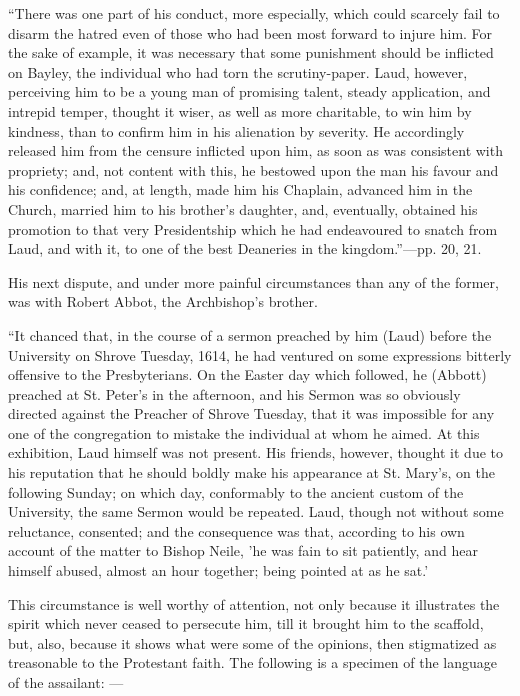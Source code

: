 ``There was one part of his conduct,
more especially, which could scarcely fail to disarm the hatred even of
those who had been most forward to injure him. For the sake of example,
it was necessary that some punishment should be inflicted on Bayley, the
individual who had torn the scrutiny-paper. Laud, however, perceiving
him to be a young man of promising talent,
steady application, and intrepid temper, thought it wiser, as well as
more charitable, to win him by kindness, than to confirm him in his
alienation by severity. He accordingly released him from the censure
inflicted upon him, as soon as was consistent with propriety; and, not
content with this, he bestowed upon the man his favour and his
confidence; and, at length, made him his Chaplain, advanced him in the
Church, married him to his brother's daughter, and, eventually, obtained
his promotion to that very Presidentship which he had endeavoured to
snatch from Laud, and with it, to one of the best Deaneries in the
kingdom.''—pp. 20, 21.

His next dispute, and under more painful
circumstances than any of the former, was with Robert Abbot, the
Archbishop's brother.

``It chanced that, in the course of a
sermon preached by him (Laud) before the University on Shrove Tuesday,
1614, he had ventured on some expressions bitterly offensive to the
Presbyterians. On the Easter day which followed, he (Abbott) preached at
St. Peter's in the afternoon, and his Sermon was so obviously directed
against the Preacher of Shrove Tuesday, that it was impossible for any
one of the congregation to mistake the individual at whom he aimed. At
this exhibition, Laud himself was not present. His friends, however,
thought it due to his reputation that he should boldly make his appearance
at St. Mary's, on the following Sunday; on which day, conformably to the
ancient custom of the University, the same Sermon would be repeated.
Laud, though not without some reluctance, consented; and the consequence
was that, according to his own account of the matter to Bishop Neile, 'he
was fain to sit patiently, and hear himself abused, almost an hour
together; being pointed at as he sat.'

This circumstance is well worthy of
attention, not only because it illustrates the spirit which never ceased
to persecute him, till it brought him to the scaffold, but, also,
because it shows what were some of the opinions, then stigmatized as
treasonable to the Protestant faith. The following is a specimen of the
language of the assailant: —

